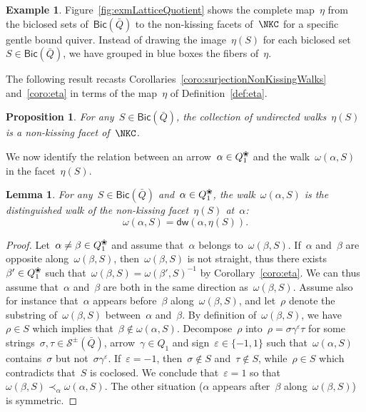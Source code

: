 \documentclass{amsart}
\newtheorem{proposition}[theorem]{Proposition}
\newtheorem{lemma}[theorem]{Lemma}
\theoremstyle{definition}
\newtheorem{example}[theorem]{Example}
\newcommand{\fref}[1]{Figure~\ref{#1}} %
\newcommand{\blossom}{^\text{\ding{96}}} %
\newcommand{\strings}{\mathcal{S}} %
\newcommand{\distinguishedWalk}[2]{\mathsf{dw}(#1,#2)} %
\newcommand{\Bicl}[1]{\mathsf{Bic}(#1)} %
\begin{document}
\begin{example}
\fref{fig:exmLatticeQuotient} shows the complete map~$\eta$ from the biclosed sets of~$\Bicl{\bar Q}$ to the non-kissing facets of~$\NKC$ for a specific gentle bound quiver.
Instead of drawing the image~$\eta(S)$ for each biclosed set~$S \in \Bicl{\bar Q}$, we have grouped in blue boxes the fibers of~$\eta$.
\end{example}

\enlargethispage{.2cm}
The following result recasts Corollaries~\ref{coro:surjectionNonKissingWalks} and~\ref{coro:eta} in terms of the map~$\eta$ of Definition~\ref{def:eta}.

\begin{proposition}
For any~$S \in \Bicl{\bar Q}$, the collection of undirected walks~$\eta(S)$ is a non-kissing facet of~$\NKC$.
\end{proposition}

We now identify the relation between an arrow~$\alpha \in Q_1\blossom$ and the walk~$\omega(\alpha,S)$ in the facet~$\eta(S)$.

\begin{lemma}
\label{lem:distinguishedWalkEta}
For any~$S \in \Bicl{\bar Q}$ and~$\alpha \in Q_1\blossom$, the walk~$\omega(\alpha,S)$ is the distinguished walk of the non-kissing facet~$\eta(S)$ at~$\alpha$:
\[
\omega(\alpha,S) = \distinguishedWalk{\alpha}{\eta(S)}.
\]
\end{lemma}

\begin{proof}
Let~$\alpha \ne \beta \in Q_1\blossom$ and assume that~$\alpha$ belongs to~$\omega(\beta,S)$.
If~$\alpha$ and~$\beta$ are opposite along~$\omega(\beta,S)$, then~$\omega(\beta,S)$ is not straight, thus there exists~$\beta' \in Q_1\blossom$ such that~${\omega(\beta,S) = \omega(\beta',S)^{-1}}$ by Corollary~\ref{coro:eta}.
We can thus assume that~$\alpha$ and~$\beta$ are both in the same direction as~$\omega(\beta,S)$.
Assume also for instance that~$\alpha$ appears before~$\beta$ along~$\omega(\beta,S)$, and let~$\rho$ denote the substring of~$\omega(\beta,S)$ between~$\alpha$ and~$\beta$.
By definition of~$\omega(\beta,S)$, we have~$\rho \in S$ which implies that~$\beta \notin \omega(\alpha,S)$.
Decompose~$\rho$ into~$\rho = \sigma \gamma^\varepsilon \tau$ for some strings~$\sigma, \tau \in \strings^\pm(\bar Q)$, arrow~$\gamma \in Q_1$ and sign~$\varepsilon \in \{-1,1\}$ such that~$\omega(\alpha,S)$ contains~$\sigma$ but not~$\sigma \gamma^\varepsilon$.
If~$\varepsilon = -1$, then~$\sigma \notin S$ and~$\tau \notin S$, while~$\rho \in S$ which contradicts that~$S$ is coclosed.
We conclude that~$\varepsilon = 1$ so that~$\omega(\beta,S) \prec_\alpha \omega(\alpha,S)$.
The other situation ($\alpha$ appears after~$\beta$ along~$\omega(\beta,S)$) is symmetric.
\end{proof}
\end{document}
